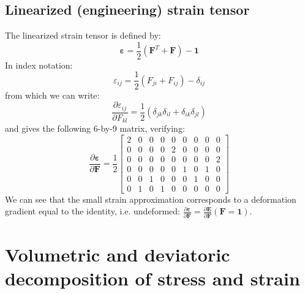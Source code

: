 \documentclass[letterpaper,12pt,oneside]{report}
\begin{document}
\subsection{Linearized (engineering) strain tensor}
The linearized strain tensor is defined by:
\begin{equation}
\boldsymbol{\varepsilon} = \frac{1}{2}\left(\mathbf{F}^T + \mathbf{F}\right) - \mathbf{1}
\end{equation}
In index notation:
\begin{equation}
\varepsilon_{ij} = \frac{1}{2}\left(F_{ji} + F_{ij}\right) - \delta_{ij}
\end{equation}
from which we can write:
\begin{equation}
\frac{\partial \varepsilon_{ij}}{\partial F_{kl}} = \frac{1}{2}\left(\delta_{jk}\delta_{il} + \delta_{ik}\delta_{jl} \right)
\end{equation}
and gives the following 6-by-9 matrix, verifying:
\begin{equation}
\frac{\partial \boldsymbol{\varepsilon}}{\partial \mathbf{F}} = \frac{1}{2}
\left[\begin{array}{ccccccccc}
2 & 0 & 0 & 0 & 0 & 0 & 0 & 0 & 0 \\
0 & 0 & 0 & 0 & 2 & 0 & 0 & 0 & 0 \\
0 & 0 & 0 & 0 & 0 & 0 & 0 & 0 & 2 \\
0 & 0 & 0 & 0 & 0 & 1 & 0 & 1 & 0 \\
0 & 0 & 1 & 0 & 0 & 0 & 1 & 0 & 0 \\
0 & 1 & 0 & 1 & 0 & 0 & 0 & 0 & 0
\end{array}\right]
\end{equation}
We can see that the small strain approximation corresponds to a deformation gradient equal to the identity, i.e. undeformed: $\frac{\partial \boldsymbol{\varepsilon}}{\partial \mathbf{F}} = \frac{\partial \mathbf{E}}{\partial \mathbf{F}}(\mathbf{F}=\mathbf{1})$.





\section{Volumetric and deviatoric decomposition of stress and strain}
\end{document}
